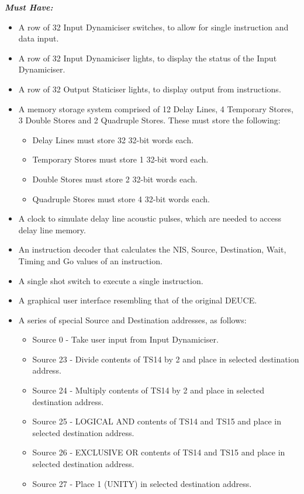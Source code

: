 \documentclass{l4proj}
\begin{document}
\textbf{\textit{Must Have:}}
\begin{itemize}
	\item A row of 32 Input Dynamiciser switches, to allow for single instruction and data input.
	\item A row of 32 Input Dynamiciser lights, to display the status of the Input Dynamiciser.
	\item A row of 32 Output Staticiser lights, to display output from instructions.
	\item A memory storage system comprised of 12 Delay Lines, 4 Temporary Stores, 3 Double Stores and 2 Quadruple Stores. These must store the following:
	\begin{itemize}
		\item Delay Lines must store 32 32-bit words each.
		\item Temporary Stores must store 1 32-bit word each.
		\item Double Stores must store 2 32-bit words each.
		\item Quadruple Stores must store 4 32-bit words each.
	\end{itemize}
	\item A clock to simulate delay line acoustic pulses, which are needed to access delay line memory.
	\item An instruction decoder that calculates the NIS, Source, Destination, Wait, Timing and Go values of an instruction.
	\item A single shot switch to execute a single instruction.
	\item A graphical user interface resembling that of the original DEUCE.
	\item A series of special Source and Destination addresses, as follows:
	\begin{itemize}
		\item Source 0 - Take user input from Input Dynamiciser.
		\item Source 23 - Divide contents of TS14 by 2 and place in selected destination address.
		\item Source 24 - Multiply contents of TS14 by 2 and place in selected destination address.
		\item Source 25 - LOGICAL AND contents of TS14 and TS15 and place in selected destination address.
		\item Source 26 - EXCLUSIVE OR contents of TS14 and TS15 and place in selected destination address.
		\item Source 27 - Place 1 (UNITY) in selected destination address.

\end{itemize}
\end{itemize}
\end{document}
